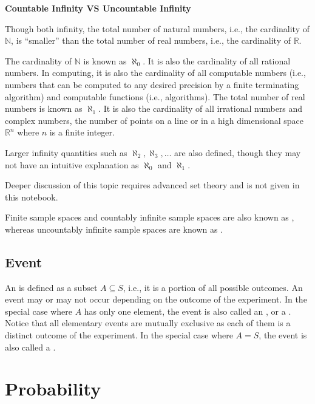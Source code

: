 \begin{mdframed}
\noindent \textbf{Countable Infinity VS Uncountable Infinity}

Though both infinity, the total number of natural numbers, i.e., the cardinality of $\mathbb{N}$, is ``smaller'' than the total number of real numbers, i.e., the cardinality of $\mathbb{R}$.

The cardinality of $\mathbb{N}$ is known as $\aleph_0$. It is also the cardinality of all rational numbers. In computing, it is also the cardinality of all computable numbers (i.e., numbers that can be computed to any desired precision by a finite terminating algorithm) and computable functions (i.e., algorithms). The total number of real numbers is known as $\aleph_1$. It is also the cardinality of all irrational numbers and complex numbers, the number of points on a line or in a high dimensional space $\mathbb{R}^n$ where $n$ is a finite integer.

Larger infinity quantities such as $\aleph_2, \aleph_3, \ldots$ are also defined, though they may not have an intuitive explanation as $\aleph_0$ and $\aleph_1$.

Deeper discussion of this topic requires advanced set theory and is not given in this notebook.
\end{mdframed}

Finite sample spaces and countably infinite sample spaces are also known as , whereas uncountably infinite sample spaces are known as .

\subsection{Event}

An  is defined as a subset $A \subseteq S$, i.e., it is a portion of all possible outcomes. An event may or may not occur depending on the outcome of the experiment. In the special case where $A$ has only one element, the event is also called an , or a . Notice that all elementary events are mutually exclusive as each of them is a distinct outcome of the experiment. In the special case where $A=S$, the event is also called a .

\section{Probability}

